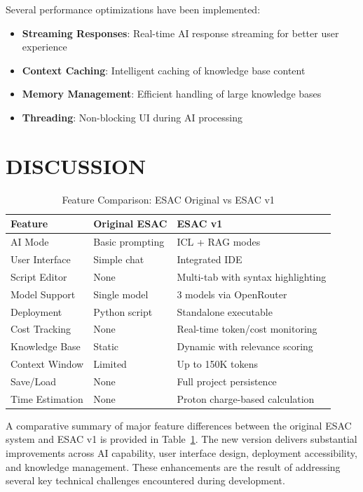 \documentclass[tm]{ornltm} %
\begin{document}
Several performance optimizations have been implemented:

\begin{itemize}
  \item \textbf{Streaming Responses}: Real-time AI response streaming for better user experience
  \item \textbf{Context Caching}: Intelligent caching of knowledge base content
  \item \textbf{Memory Management}: Efficient handling of large knowledge bases
  \item \textbf{Threading}: Non-blocking UI during AI processing
\end{itemize}


\section{DISCUSSION}
\label{sec:discussion}

\begin{table}[ht] 
\centering \caption{Feature Comparison: ESAC Original vs ESAC v1} \label{tab:comparison} 
\begin{tabular}{l l l} 
\toprule Feature & Original ESAC & ESAC v1 \\ 
\midrule AI Mode & Basic prompting & ICL + RAG modes \\ 
User Interface & Simple chat & Integrated IDE \\ 
Script Editor & None & Multi-tab with syntax highlighting \\ 
Model Support & Single model & 3 models via OpenRouter \\ 
Deployment & Python script & Standalone executable \\ 
Cost Tracking & None & Real-time token/cost monitoring \\ 
Knowledge Base & Static & Dynamic with relevance scoring \\ 
Context Window & Limited & Up to 150K tokens \\ 
Save/Load & None & Full project persistence \\ 
Time Estimation & None & Proton charge-based calculation \\ \bottomrule \end{tabular} \end{table}

A comparative summary of major feature differences between the original ESAC system and ESAC v1 is provided in Table~\ref{tab:comparison}. The new version delivers substantial improvements across AI capability, user interface design, deployment accessibility, and knowledge management. These enhancements are the result of addressing several key technical challenges encountered during development.
\end{document}

